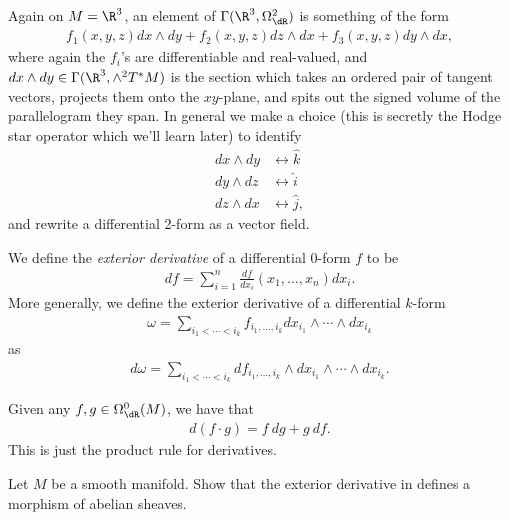 \documentclass[11pt]{amsart}
\begin{document}
\begin{example}\label{exa:2-form-R3-vector-field} 
Again on $M = \R^3$, an element of $\Gamma(\R^3,\Omega^2_\dR)$ is something of the form
\begin{align*}
    f_1(x,y,z) dx \wedge dy + f_2(x,y,z) dz\wedge dx + f_3(x,y,z) dy\wedge dx,
\end{align*}
where again the $f_i$'s are differentiable and real-valued, and $dx\wedge dy \in \Gamma(\R^3, \wedge^2 T^\ast M)$ is the section which takes an ordered pair of tangent vectors, projects them onto the $xy$-plane, and spits out the signed volume of the parallelogram they span. In general we make a choice (this is secretly the Hodge star operator which we'll learn later) to identify
\begin{align*}
    dx\wedge dy &\leftrightarrow \hat{k} \\
    dy \wedge dz & \leftrightarrow \hat{i} \\
    dz\wedge dx &\leftrightarrow \hat{j},
\end{align*}
and rewrite a differential 2-form as a vector field.
\end{example}

\begin{definition}\label{def:exterior-derivative} 
We define the \emph{exterior derivative} of a differential $0$-form $f$ to be
\begin{align*}
    df = \sum_{i=1}^n \frac{df}{dx_i}(x_1, \ldots, x_n) dx_i.
\end{align*}
More generally, we define the exterior derivative of a differential $k$-form
\begin{align*}
    \omega = \sum_{i_1 < \cdots < i_k}f_{i_1, \ldots, i_k}dx_{i_1}\wedge \cdots \wedge dx_{i_k}
\end{align*}
as
\begin{align*}
    d\omega = \sum_{i_1< \cdots < i_k} df_{i_1, \ldots, i_k} \wedge dx_{i_1}\wedge \cdots \wedge dx_{i_k}.
\end{align*}
\end{definition}

\begin{remark} Given any $f,g\in \Omega^0_\dR(M)$, we have that
\begin{align*}
    d (f\cdot g) = f\ dg + g\ df.
\end{align*}
This is just the product rule for derivatives.
\end{remark}



\begin{exercise}
Let $M$ be a smooth manifold. Show that the exterior derivative in  defines a morphism of abelian sheaves.
\end{exercise}
\end{document}
